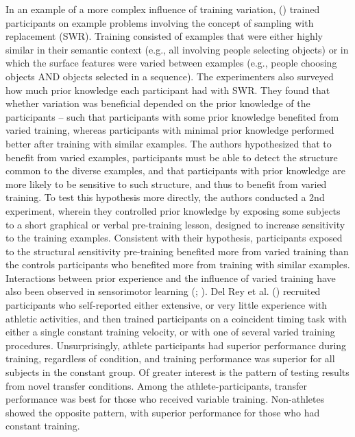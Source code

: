 \documentclass[
  11pt,
  letterpaper,
]{article}
\begin{document}
In an example of a more complex influence of training variation,
() trained participants on example problems involving the
concept of sampling with replacement (SWR). Training consisted of
examples that were either highly similar in their semantic context
(e.g., all involving people selecting objects) or in which the surface
features were varied between examples (e.g., people choosing objects AND
objects selected in a sequence). The experimenters also surveyed how
much prior knowledge each participant had with SWR. They found that
whether variation was beneficial depended on the prior knowledge of the
participants -- such that participants with some prior knowledge
benefited from varied training, whereas participants with minimal prior
knowledge performed better after training with similar examples. The
authors hypothesized that to benefit from varied examples, participants
must be able to detect the structure common to the diverse examples, and
that participants with prior knowledge are more likely to be sensitive
to such structure, and thus to benefit from varied training. To test
this hypothesis more directly, the authors conducted a 2nd experiment,
wherein they controlled prior knowledge by exposing some subjects to a
short graphical or verbal pre-training lesson, designed to increase
sensitivity to the training examples. Consistent with their hypothesis,
participants exposed to the structural sensitivity pre-training
benefited more from varied training than the controls participants who
benefited more from training with similar examples. Interactions between
prior experience and the influence of varied training have also been
observed in sensorimotor learning
(;
). Del Rey et al.
() recruited
participants who self-reported either extensive, or very little
experience with athletic activities, and then trained participants on a
coincident timing task with either a single constant training velocity,
or with one of several varied training procedures. Unsurprisingly,
athlete participants had superior performance during training,
regardless of condition, and training performance was superior for all
subjects in the constant group. Of greater interest is the pattern of
testing results from novel transfer conditions. Among the
athlete-participants, transfer performance was best for those who
received variable training. Non-athletes showed the opposite pattern,
with superior performance for those who had constant training.
\end{document}
